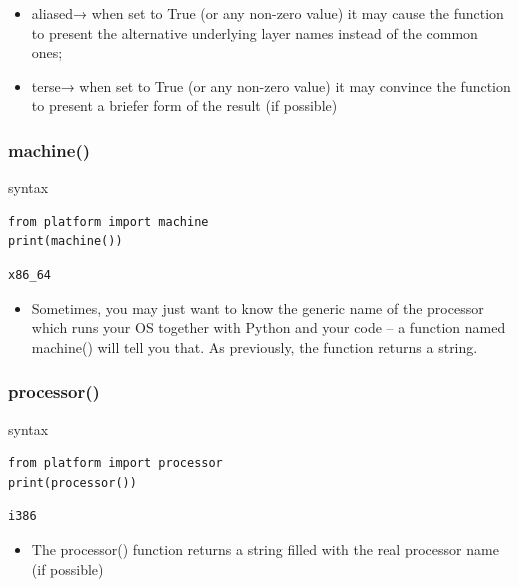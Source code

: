 \documentclass[11pt]{article}
\begin{document}
\begin{itemize}
\item aliased→ when set to True (or any non-zero value) it may cause the
function to present the alternative underlying layer names instead
of the common ones;
\item terse→ when set to True (or any non-zero value) it may convince
the function to present a briefer form of the result (if possible)
\end{itemize}

\subsubsection{machine()}
\label{sec:orgf045390}
\begin{description}
\item[{syntax}] 
\end{description}
\begin{verbatim}
from platform import machine
print(machine())
\end{verbatim}

\begin{verbatim}
x86_64
\end{verbatim}

\begin{itemize}
\item Sometimes, you may just want to know the generic name of the
processor which runs your OS together with Python and your code – a
function named machine() will tell you that. As previously, the
function returns a string.
\end{itemize}

\subsubsection{processor()}
\label{sec:orgf7680da}
\begin{description}
\item[{syntax}] 
\end{description}
\begin{verbatim}
from platform import processor
print(processor())
\end{verbatim}

\begin{verbatim}
i386
\end{verbatim}

\begin{itemize}
\item The processor() function returns a string filled with the real
processor name (if possible)
\end{itemize}
\end{document}
